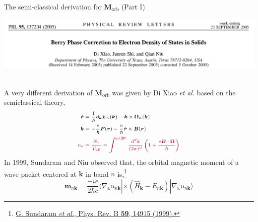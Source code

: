 \documentclass{beamer}
\begin{document}
    \begin{frame}{The semi-classical derivation for \(\bm{M}_{\text{orb}}\)  (Part I)}\small
      \begin{tcolorbox}[beamer,width=\textwidth,arc=0pt,boxsep=0.3pt,left=0pt,right=0pt,top=0pt,bottom=0pt]
        \includegraphics[width=\textwidth]{figure/classical-Morb.png}
      \end{tcolorbox}
      \ \\

      A very different derivation of \(\bm{M}_{\text{orb}}\) was given by Di Xiao \emph{et al.} based on the semiclassical theory, 
      \begin{subequations}
        \label{eq::niuq}\scriptsize
        \begin{align}
          \dot{\bm{r}} &= \frac{1}{\hbar}\partial_{\bm{k}}E_{n}(\bm{k}) - \dot{\bm{k}}\times\bm{\Omega}_{n}(\bm{k})\\
          \dot{\bm{k}} &= -\frac{e}{\hbar}\bm{F}(\bm{r}) - \frac{e}{\hbar}\dot{\bm{r}}\times\bm{B}(\bm{r})\\
          {\color{purple}n_e }&\;{\color{purple}= \frac{N_e}{V_{\text{all}}} = \int^{\mu(\bm{B})}\frac{\mathrm{d}^dk}{(2\pi)^d}\left(1 + \frac{e\bm{B}\cdot\bm{\Omega}}{\hbar}\right)}
        \end{align}
      \end{subequations}
      In 1999, Sundaram and Niu observed that, the orbital magnetic moment of a wave packet centered at \(\bm{k}\) in band \(n\) is,\footnote{\tiny \href{https://doi.org/10.1103/PhysRevB.59.14915}{G. Sundaram \emph{et al.}, Phys. Rev. B \textbf{59}, 14915 (1999).}}
      \begin{equation}
        \label{eq::xiaodi}
        \bm{m}_{n\bm{k}} = \frac{-ie}{2\hbar{}c}\langle\nabla_{\bm{k}}u_{n\bm{k}}|\times(\widehat{H}_{\bm{k}}-E_{n\bm{k}})|\nabla_{\bm{k}}u_{n\bm{k}}\rangle
      \end{equation}
    \end{frame}
\end{document}
